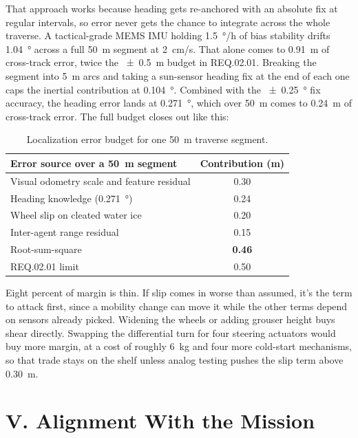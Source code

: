 \documentclass[11pt]{article}
\begin{document}
That approach works because heading gets re-anchored with an absolute fix at regular intervals, so error never
gets the chance to integrate across the whole traverse. A tactical-grade MEMS IMU holding \SI{1.5}{\degree/h} of
bias stability drifts \SI{1.04}{\degree} across a full \SI{50}{m} segment at \SI{2}{cm/s}. That alone comes to
\SI{0.91}{m} of cross-track error, twice the \SI{\pm 0.5}{m} budget in REQ.02.01. Breaking the segment into
\SI{5}{m} arcs and taking a sun-sensor heading fix at the end of each one caps the inertial contribution at
\SI{0.104}{\degree}. Combined with the \SI{\pm 0.25}{\degree} fix accuracy, the heading error lands at
\SI{0.271}{\degree}, which over \SI{50}{m} comes to \SI{0.24}{m} of cross-track error. The full budget closes
out like this:

\begin{table}[H]
    \centering
    \begin{tabular}{lc}
        \toprule
        \textbf{Error source over a \SI{50}{m} segment} & \textbf{Contribution (\si{m})} \\
        \midrule
        Visual odometry scale and feature residual & 0.30 \\
        Heading knowledge (\SI{0.271}{\degree}) & 0.24 \\
        Wheel slip on cleated water ice & 0.20 \\
        Inter-agent range residual & 0.15 \\
        \midrule
        Root-sum-square & \textbf{0.46} \\
        REQ.02.01 limit & 0.50 \\
        \bottomrule
    \end{tabular}
    \caption{Localization error budget for one \SI{50}{m} traverse segment.}
\end{table}

Eight percent of margin is thin. If slip comes in worse than assumed, it's the term to attack first, since a
mobility change can move it while the other terms depend on sensors already picked. Widening the wheels or
adding grouser height buys shear directly. Swapping the differential turn for four steering actuators would buy
more margin, at a cost of roughly \SI{6}{kg} and four more cold-start mechanisms, so that trade stays on the
shelf unless analog testing pushes the slip term above \SI{0.30}{m}.

\bigskip

\section*{V. Alignment With the Mission}
\end{document}
